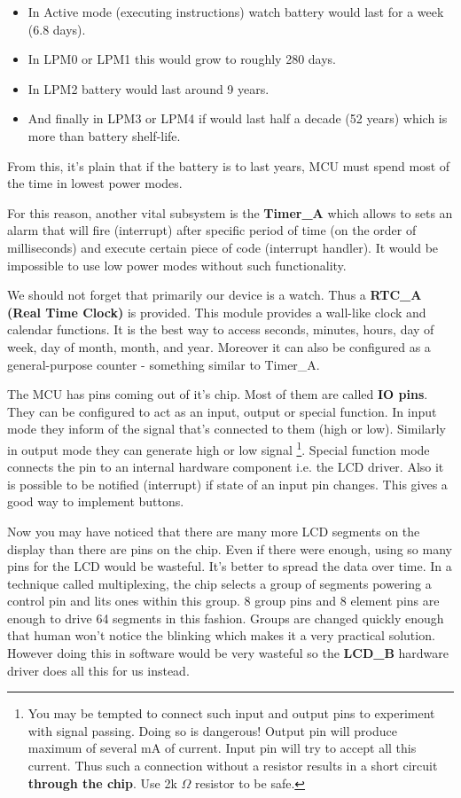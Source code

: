 \begin{itemize}
    \item In Active mode (executing instructions) watch battery would
    last for a week (6.8 days).
    \item In LPM0 or LPM1 this would grow to roughly 280 days.
    \item In LPM2 battery would last around 9 years.
    \item And finally in LPM3 or LPM4 if would last half a decade (52
    years) which is more than battery shelf-life.
\end{itemize}
From this, it's plain that if the battery is to last years, MCU must
spend most of the time in lowest power modes.

For this reason, another vital subsystem is the {\bf Timer\_A} which
allows to sets an alarm that will fire (interrupt) after specific
period of time (on the order of milliseconds) and execute certain
piece of code (interrupt handler). It would be impossible to use low
power modes without such functionality.

We should not forget that primarily our device is a watch. Thus a {\bf
RTC\_A (Real Time Clock)} is provided. This module provides a
wall-like clock and calendar functions. It is the best way to access
seconds, minutes, hours, day of week, day of month, month, and year.
Moreover it can also be configured as a general-purpose counter -
something similar to Timer\_A.

The MCU has pins coming out of it's chip. Most of them are called {\bf
IO pins}. They can be configured to act as an input, output or special
function.  In input mode they inform of the signal that's connected to
them (high or low). Similarly in output mode they can generate high or
low signal \footnote{You may be tempted to connect such input and
output pins to experiment with signal passing. Doing so is dangerous!
Output pin will produce maximum of several mA of current. Input pin
will try to accept all this current. Thus such a connection without a
resistor results in a short circuit {\bf through the chip}. Use 2k
$\Omega$ resistor to be safe.}. Special function mode connects the pin
to an internal hardware component i.e.  the LCD driver.  Also it is
possible to be notified (interrupt) if state of an input pin changes.
This gives a good way to implement buttons.

Now you may have noticed that there are many more LCD segments on the
display than there are pins on the chip. Even if there were enough,
using so many pins for the LCD would be wasteful. It's better to
spread the data over time. In a technique called multiplexing, the
chip selects a group of segments powering a control pin and lits ones
within this group. 8 group pins and 8 element pins are enough to drive
64 segments in this fashion. Groups are changed quickly enough that human
won't notice the blinking which makes it a very practical solution.
However doing this in software would be very wasteful so the {\bf
LCD\_B} hardware driver does all this for us instead.

